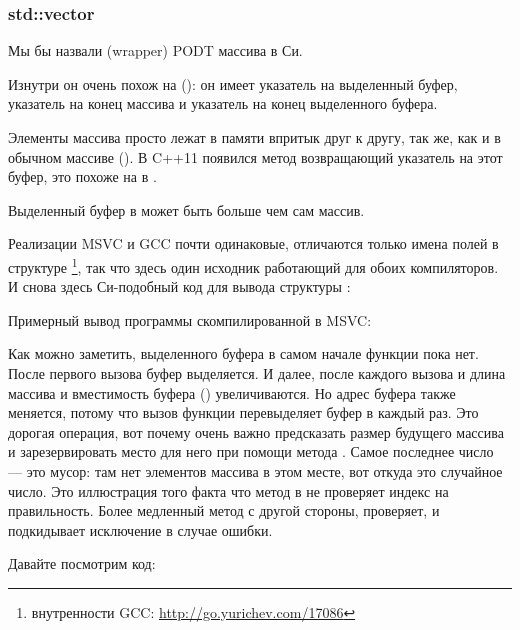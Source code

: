 \subsubsection{std::vector}

Мы бы назвали   (wrapper) \ac{PODT} массива в Си.

Изнутри он очень похож на  ():
он имеет указатель на выделенный буфер, указатель на конец массива и указатель на конец выделенного буфера.

Элементы массива просто лежат в памяти впритык друг к другу, так же, как и в обычном массиве ().
В C++11 появился метод  возвращающий указатель на этот буфер, это похоже на  в .

Выделенный буфер в  может быть больше чем сам массив.

Реализации MSVC и GCC почти одинаковые, отличаются только имена полей в структуре
\footnote
{внутренности GCC: \url{http://go.yurichev.com/17086}}, так что здесь один исходник работающий для обоих компиляторов.
И снова здесь Си-подобный код для вывода структуры :



Примерный вывод программы скомпилированной в MSVC:



Как можно заметить, выделенного буфера в самом начале функции \main пока нет.
После первого вызова  буфер выделяется.
И далее, после каждого вызова  
и длина массива и вместимость буфера () увеличиваются.
Но адрес буфера также меняется, потому что вызов функции  перевыделяет буфер в 
каждый раз.
Это дорогая операция, вот почему очень важно предсказать размер будущего массива и зарезервировать место для него
при помощи метода .
Самое последнее число --- это мусор: там нет элементов массива в этом месте, вот откуда это случайное число.
Это иллюстрация того факта что метод  в  не проверяет индекс на правильность.
Более медленный метод  с другой стороны, проверяет, и подкидывает исключение  
в случае ошибки.

Давайте посмотрим код:



